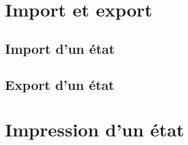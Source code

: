 \section{Import et export\label{reports-importexport} }


\subsection{Import d'un état\label{reports-importexport-import} }


\subsection{Export d'un état\label{reports-importexport-export} }

\section{Impression d'un état\label{reports-print}}












